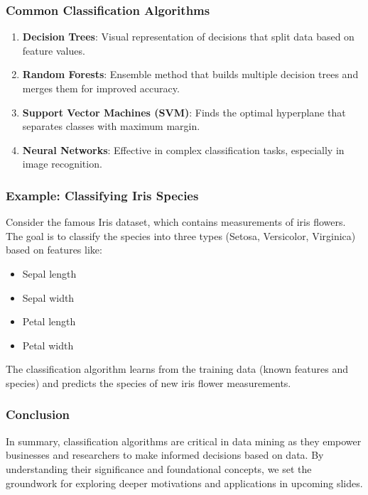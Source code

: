 \documentclass[aspectratio=169]{beamer}
\begin{document}
\begin{frame}[fragile]
    \frametitle{Common Classification Algorithms}
    \begin{enumerate}
        \item \textbf{Decision Trees}: Visual representation of decisions that split data based on feature values.
        \item \textbf{Random Forests}: Ensemble method that builds multiple decision trees and merges them for improved accuracy.
        \item \textbf{Support Vector Machines (SVM)}: Finds the optimal hyperplane that separates classes with maximum margin.
        \item \textbf{Neural Networks}: Effective in complex classification tasks, especially in image recognition.
    \end{enumerate}
\end{frame}

\begin{frame}[fragile]
    \frametitle{Example: Classifying Iris Species}
    Consider the famous Iris dataset, which contains measurements of iris flowers. The goal is to classify the species into three types (Setosa, Versicolor, Virginica) based on features like:
    \begin{itemize}
        \item Sepal length
        \item Sepal width
        \item Petal length
        \item Petal width
    \end{itemize}
    
    The classification algorithm learns from the training data (known features and species) and predicts the species of new iris flower measurements.
\end{frame}

\begin{frame}[fragile]
    \frametitle{Conclusion}
    In summary, classification algorithms are critical in data mining as they empower businesses and researchers to make informed decisions based on data. By understanding their significance and foundational concepts, we set the groundwork for exploring deeper motivations and applications in upcoming slides.
\end{frame}
\end{document}
